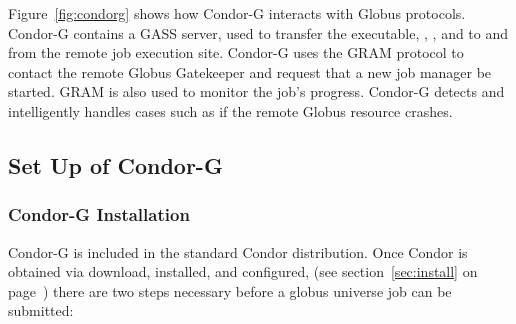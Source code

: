 Figure~\ref{fig:condorg} shows how Condor-G interacts with Globus protocols.
Condor-G contains a GASS server, used to transfer the executable,
, , and  to and from
the remote job execution site.
Condor-G uses the GRAM protocol to contact the remote Globus Gatekeeper
and request that a new job manager be started.
GRAM is also used to monitor the job's progress.
Condor-G detects and intelligently handles cases
such as if the remote Globus resource crashes.

\subsection{\label{sec:Condor-G-Setup}Set Up of Condor-G}

\subsubsection{\label{sec:Condor-G-Install}Condor-G Installation}
Condor-G is included in the standard Condor distribution.
Once Condor is obtained via download, installed, and configured,
(see
section~\ref{sec:install} on page~\pageref{sec:install})
there are two steps necessary before a globus universe job
can be submitted:


